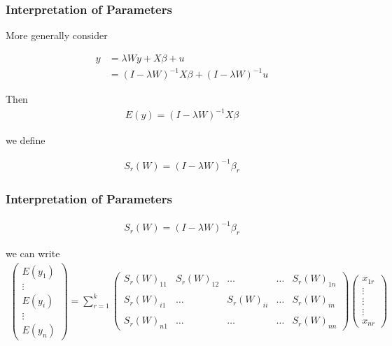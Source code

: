 \documentclass[
  shownotes,
  xcolor={svgnames},
  hyperref={colorlinks,citecolor=DarkBlue,linkcolor=DarkRed,urlcolor=DarkBlue}
  ]{beamer}
\begin{document}
\begin{frame}
\frametitle{Interpretation of Parameters}
More generally consider 

\begin{align}
y&=\lambda Wy+X\beta+u \nonumber \\
 &=(I-\lambda W)^{-1}X\beta+(I-\lambda W)^{-1}u \nonumber
\end{align}

Then 
\begin{align}
E(y)=(I-\lambda W)^{-1}X\beta
\end{align}

we define

\begin{align}
S_r(W)=(I-\lambda W)^{-1}\beta_r
\end{align}

\end{frame}
\begin{frame}
\frametitle{Interpretation of Parameters}
\begin{align}
S_r(W)=(I-\lambda W)^{-1}\beta_r
\end{align}

we can write 
\begin{align}
\left(\begin{array}{c}
E(y_{1})\\
\vdots\\
E(y_{i})\\
\vdots\\
E(y_{n})
\end{array}\right)=\sum_{r=1}^{k}\left(\begin{array}{ccccc}
S_{r}(W)_{11} & S_{r}(W)_{12} & \dots & \dots & S_{r}(W)_{1n}\\
\\
S_{r}(W)_{i1} & \dots & S_{r}(W)_{ii} & \dots & S_{r}(W)_{in}\\
\\
S_{r}(W)_{n1} & \dots & \dots & \dots & S_{r}(W)_{nn}
\end{array}\right)\left(\begin{array}{c}
x_{1r}\\
\vdots\\
\vdots\\
\vdots\\
x_{nr}
\end{array}\right) \nonumber
\end{align}

\end{frame}
\end{document}
